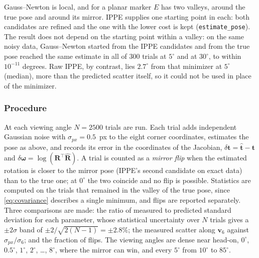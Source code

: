 \documentclass[11pt,a4paper]{article}
\theoremstyle{definition}
\theoremstyle{plain}
\theoremstyle{remark}
\newcommand{\code}[1]{\texttt{#1}}
\begin{document}
Gauss--Newton is local, and for a planar marker $E$ has two valleys, around the
true pose and around its mirror. IPPE supplies one starting point in each: both
candidates are refined and the one with the lower cost is kept
(\code{estimate\_pose}). The result does not depend on the starting point within
a valley: on the same noisy data, Gauss--Newton started from the IPPE candidates
and from the true pose reached the same estimate in all of $300$ trials at
$5^\circ$ and at $30^\circ$, to within $10^{-11}$ degrees. Raw IPPE, by contrast,
lies $2.7^\circ$ from that minimizer at $5^\circ$ (median), more than the
predicted scatter itself, so it could not be used in place of the minimizer.

\subsubsection{Procedure}

At each viewing angle $N = 2500$ trials are run. Each trial adds independent
Gaussian noise with $\sigma_{px} = 0.5$~px to the eight corner coordinates,
estimates the pose as above, and records its error in the coordinates of the
Jacobian, $\delta\mathbf{t} = \hat{\mathbf{t}} - \mathbf{t}$ and
$\delta\boldsymbol{\omega} = \log(\mathbf{R}^\top\hat{\mathbf{R}})$. A trial is
counted as a \emph{mirror flip} when the estimated rotation is closer to the
mirror pose (IPPE's second candidate on exact data) than to the true one; at
$0^\circ$ the two coincide and no flip is possible. Statistics are computed on
the trials that remained in the valley of the true pose, since
\eqref{eq:covariance} describes a single minimum, and flips are reported
separately. Three comparisons are made: the ratio of measured to predicted
standard deviation for each parameter, whose statistical uncertainty over $N$
trials gives a $\pm2\sigma$ band of $\pm2/\sqrt{2(N-1)} = \pm2.8\%$; the measured
scatter along $\mathbf{v}_6$ against $\sigma_{px}/\sigma_6$; and the fraction of
flips. The viewing angles are dense near head-on, $0^\circ$, $0.5^\circ$,
$1^\circ$, $2^\circ$, \dots, $8^\circ$, where the mirror can win, and every
$5^\circ$ from $10^\circ$ to $85^\circ$.
\end{document}
